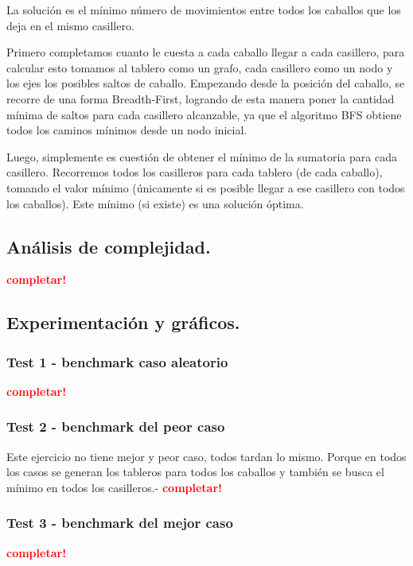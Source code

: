 \vspace*{0.3cm}

La solución es el mínimo número de movimientos entre todos los caballos que
los deja en el mismo casillero.

Primero completamos cuanto le cuesta a cada caballo llegar a cada
casillero, para calcular esto tomamos al tablero como un grafo, cada
casillero como un nodo y los ejes los posibles saltos de caballo. Empezando
desde la posición del caballo, se recorre de una forma Breadth-First,
logrando de esta manera poner la cantidad mínima de saltos para cada
casillero alcanzable, ya que el algoritmo BFS obtiene todos los caminos
mínimos desde un nodo inicial.

Luego, simplemente es cuestión de obtener el mínimo de la sumatoria para cada casillero.
Recorremos todos los casilleros para cada tablero (de cada caballo),
tomando el valor mínimo (únicamente si es posible llegar a ese casillero
con todos los caballos).
Este mínimo (si existe) es una solución óptima.

\newpage
\subsection{Análisis de complejidad.}

\vspace*{0.3cm}

\textcolor{red}{\textbf{completar!}}



\newpage
\subsection{Experimentación y gráficos.}

\vspace*{0.3cm}

\subsubsection{Test 1 - benchmark caso aleatorio}

\textcolor{red}{\textbf{completar!}}


\newpage
\subsubsection{Test 2 - benchmark del peor caso}

Este ejercicio no tiene mejor y peor caso, todos tardan lo mismo.
Porque en todos los casos se generan los tableros para todos los caballos
y también se busca el mínimo en todos los casilleros.-
\textcolor{red}{\textbf{completar!}}


\newpage
\subsubsection{Test 3 - benchmark del mejor caso}

\textcolor{red}{\textbf{completar!}}
